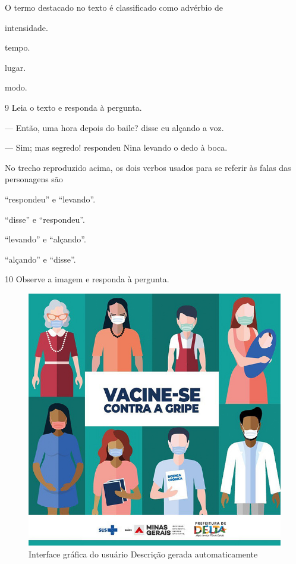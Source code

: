 \begin{myquote}
\begin{myescolha}
O termo destacado no texto é classificado como advérbio de

\begin{multicols}{2}
\begin{escolha}
  \item intensidade.

  \item tempo.

  \item lugar.

  \item modo.
\end{escolha}
\end{multicols}


\num{9} Leia o texto e responda à pergunta.

\begin{myquote}
--- Então, uma hora depois do baile? disse eu alçando a voz.

--- Sim; mas segredo! respondeu Nina levando o dedo à boca.

\end{myquote}

No trecho reproduzido acima, os dois verbos usados para se referir às
falas das personagens são

\begin{escolha}
  \item ``respondeu'' e ``levando''.

  \item ``disse'' e ``respondeu''.

  \item ``levando'' e ``alçando''.

  \item ``alçando'' e ``disse''.
\end{escolha}

\num{10} Observe a imagem e responda à pergunta.
 
\begin{myquote}
\begin{figure}
\centering
\includegraphics[width=.5\textwidth]{./imgQ4PORT/media/image7.jpeg}
\caption{Interface gráfica do usuário Descrição gerada automaticamente}
\end{figure}


\end{myquote}
\end{myescolha}
\end{myquote}
